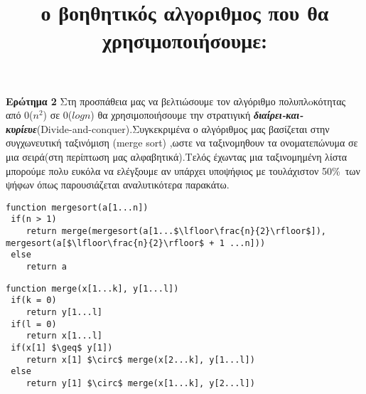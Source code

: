 \documentclass[a4paper]{article}
\begin{document}
\newpage

\textbf{
\color{red}Ερώτημα 2}
Στη προσπάθεια μας να βελτιώσουμε τον αλγόριθμο πολυπλoκότητας από 0($n^2$) σε 0($logn$) θα χρησιμοποιήσουμε την στρατιγική \textit{\textbf{διαίρει-και-κυρίευε}}(Divide-and-conquer).Συγκεκριμένα ο αλγόριθμος  μας βασίζεται στην συγχωνευτική ταξινόμιση (merge sort) ,ωστε να ταξινομηθουν τα ονοματεπώνυμα σε μια σειρά(στη περίπτωση μας αλφαβητικά).Τελός έχωντας μια ταξινομημένη λίστα μπορούμε πολυ ευκόλα να ελέγξουμε αν υπάρχει υποψήφιος με τουλάχιστον 50\%\ των ψήφων όπως παρουσιάζεται  αναλυτικότερα παρακάτω. 



         \title{ο βοηθητικός αλγοριθμος που θα χρησιμοποιήσουμε:}
         
\lstset{frame=none}

\begin{tcolorbox}[colback=blue!20!white,colframe=purple!60!white,title=\textbf{Merge Sort}]
\begin{lstlisting}[mathescape]
function mergesort(a[1...n])
 if(n > 1)
 	return merge(mergesort(a[1...$\lfloor\frac{n}{2}\rfloor$]), mergesort(a[$\lfloor\frac{n}{2}\rfloor$ + 1 ...n]))
 else
 	return a
\end{lstlisting}

\begin{lstlisting}[mathescape]
function merge(x[1...k], y[1...l])
 if(k = 0)
 	return y[1...l]
 if(l = 0)
 	return x[1...l]
 if(x[1] $\geq$ y[1])
 	return x[1] $\circ$ merge(x[2...k], y[1...l])
 else
 	return y[1] $\circ$ merge(x[1...k], y[2...l])
\end{lstlisting}
\end{tcolorbox}
\end{document}
